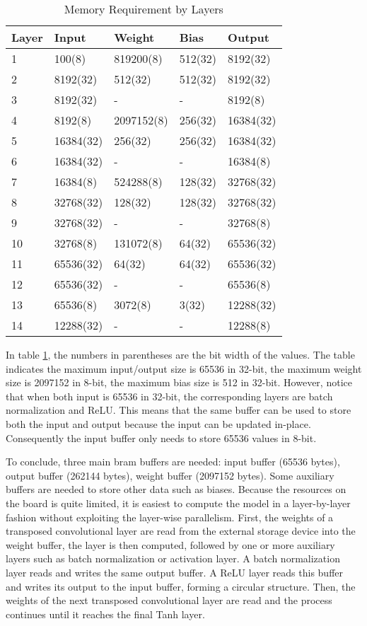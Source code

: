 \begin{table}[h]
  \centering
  \caption{Memory Requirement by Layers}
  \begin{tabular}{l | l | l | l | l}
    \toprule
    Layer & Input & Weight & Bias & Output \\
    \midrule
    1 & 100(8) & 819200(8) & 512(32) & 8192(32) \\
    2 & 8192(32) & 512(32) & 512(32) & 8192(32) \\
    3 & 8192(32) & - & - & 8192(8) \\
    4 & 8192(8) & 2097152(8) & 256(32) & 16384(32) \\
    5 & 16384(32) & 256(32) & 256(32) & 16384(32) \\
    6 & 16384(32) & - & - & 16384(8) \\
    7 & 16384(8) & 524288(8) & 128(32) & 32768(32) \\
    8 & 32768(32) & 128(32) & 128(32) & 32768(32) \\
    9 & 32768(32) & - & - & 32768(8) \\
    10 & 32768(8) & 131072(8) & 64(32) & 65536(32) \\
    11 & 65536(32) & 64(32) & 64(32) & 65536(32) \\
    12 & 65536(32) & - & - & 65536(8) \\
    13 & 65536(8) & 3072(8) & 3(32) & 12288(32) \\
    14 & 12288(32) & - & - & 12288(8) \\
    \bottomrule
  \end{tabular}
  \label{table:memory_requirements}
\end{table}

In table \ref{table:memory_requirements}, the numbers in parentheses are the bit width of the values. The table
indicates the maximum input/output size is 65536 in 32-bit, the maximum weight size is 2097152 in 8-bit, the
maximum bias size is 512 in 32-bit. However, notice that when both input is 65536 in 32-bit, the corresponding
layers are batch normalization and ReLU. This means that the same buffer can be used to store both the
input and output because the input can be updated in-place. Consequently the input buffer only needs to
store 65536 values in 8-bit.

To conclude, three main \gls{bram} buffers are needed: input buffer (65536 bytes),
output buffer (262144 bytes),
weight buffer (2097152 bytes). Some auxiliary buffers are needed to store other data such as biases.
Because the resources on the board is quite limited, it is easiest to compute the model in a layer-by-layer
fashion without exploiting the layer-wise parallelism. First, the weights of a transposed
convolutional layer are read from the external storage device into the weight buffer,
the layer is then computed, followed by one or
more auxiliary layers such as batch normalization or activation layer. A batch normalization layer
reads and writes the same output buffer. A ReLU layer reads this buffer and writes its output to
the input buffer, forming a circular structure. Then, the weights of the next transposed
convolutional layer are read and the process continues until it reaches the final Tanh layer.


